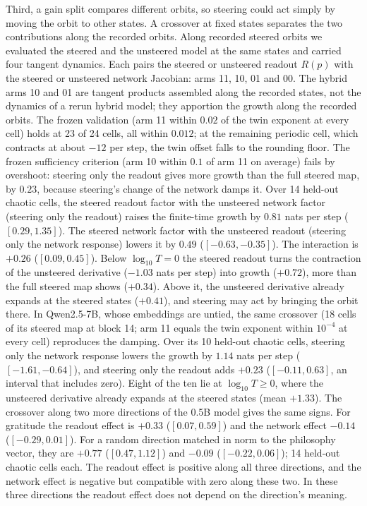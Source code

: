 \documentclass[11pt,letterpaper]{article}
\begin{document}
Third, a gain split compares different orbits, so steering could act simply by moving the orbit to other states. A
crossover at fixed states separates the two contributions along the recorded orbits. Along recorded steered orbits we
evaluated the steered and the unsteered model at the same states and carried four tangent dynamics. Each pairs the
steered or unsteered readout $R(p)$ with the steered or unsteered network Jacobian: arms 11, 10, 01 and 00. The
hybrid arms 10 and 01 are tangent products assembled along the recorded states, not the dynamics of a rerun hybrid
model; they apportion the growth along the recorded orbits. The frozen
validation (arm 11 within $0.02$ of the twin exponent at every cell) holds at 23 of 24 cells, all within $0.012$; at
the remaining periodic cell, which contracts at about $-12$ per step, the twin offset falls to the rounding floor. The
frozen sufficiency criterion (arm 10 within $0.1$ of arm 11 on average) fails by overshoot: steering only the readout
gives more growth than the full steered map, by $0.23$, because steering's change of the network damps it. Over 14 held-out chaotic cells, the steered readout factor with the unsteered network factor (steering only the
readout) raises the finite-time growth by $0.81$ nats per step ($[0.29,1.35]$). The steered network factor with the
unsteered readout (steering only the network response) lowers it by $0.49$ ($[-0.63,-0.35]$). The interaction is
$+0.26$ ($[0.09,0.45]$). Below $\log_{10}T=0$ the steered readout turns the contraction of the unsteered derivative
($-1.03$ nats per step) into growth ($+0.72$), more than the full steered map shows ($+0.34$). Above it, the unsteered
derivative already expands at the steered states ($+0.41$), and steering may act by bringing the orbit there. In
Qwen2.5-7B, whose embeddings are untied, the same crossover (18 cells of its steered map at block 14; arm 11 equals the
twin exponent within $10^{-4}$ at every cell) reproduces the damping. Over its 10 held-out chaotic cells, steering only
the network response lowers the growth by $1.14$ nats per step ($[-1.61,-0.64]$), and steering only the readout adds $+0.23$ ($[-0.11,0.63]$, an interval that includes zero). Eight of the ten lie at $\log_{10}T\ge0$, where the unsteered derivative already expands at
the steered states (mean $+1.33$). The crossover along two more directions of the 0.5B model gives the same
signs. For gratitude the readout effect is $+0.33$ ($[0.07,0.59]$) and the network effect $-0.14$ ($[-0.29,0.01]$). For
a random direction matched in norm to the philosophy vector, they are $+0.77$ ($[0.47,1.12]$) and $-0.09$
($[-0.22,0.06]$); 14 held-out chaotic cells each. The readout effect is positive along all three directions, and the
network effect is negative but compatible with zero along these two. In these three directions the readout effect
does not depend on the direction's meaning.
\end{document}
